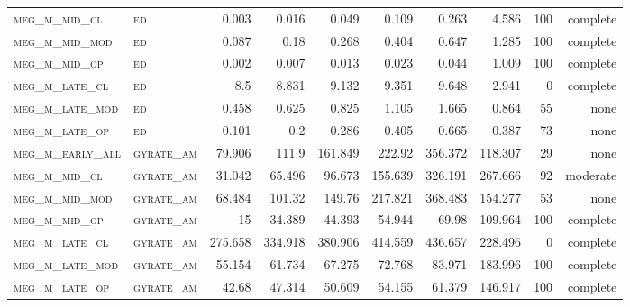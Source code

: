 \begin{landscape}
\begin{center}
\begin{footnotesize}
\begin{longtable}{llrrrrr|rrr}
\textsc{meg\_m\_mid\_cl   } & \textsc{ed        }    & 0.003    & 0.016    & 0.049    & 0.109    & 0.263      & 4.586         & 100           & complete             \\
\textsc{meg\_m\_mid\_mod  } & \textsc{ed        }    & 0.087    & 0.18     & 0.268    & 0.404    & 0.647      & 1.285         & 100           & complete             \\
\textsc{meg\_m\_mid\_op   } & \textsc{ed        }    & 0.002    & 0.007    & 0.013    & 0.023    & 0.044      & 1.009         & 100           & complete             \\
\textsc{meg\_m\_late\_cl  } & \textsc{ed        }    & 8.5      & 8.831    & 9.132    & 9.351    & 9.648      & 2.941         & 0             & complete            \\
\textsc{meg\_m\_late\_mod } & \textsc{ed        }    & 0.458    & 0.625    & 0.825    & 1.105    & 1.665      & 0.864         & 55            & none              \\
\textsc{meg\_m\_late\_op  } & \textsc{ed        }    & 0.101    & 0.2      & 0.286    & 0.405    & 0.665      & 0.387         & 73            & none              \\
\textsc{meg\_m\_early\_all} & \textsc{gyrate\_am}    & 79.906   & 111.9    & 161.849  & 222.92   & 356.372    & 118.307       & 29            & none             \\
\textsc{meg\_m\_mid\_cl   } & \textsc{gyrate\_am}    & 31.042   & 65.496   & 96.673   & 155.639  & 326.191    & 267.666       & 92            & moderate              \\
\textsc{meg\_m\_mid\_mod  } & \textsc{gyrate\_am}    & 68.484   & 101.32   & 149.76   & 217.821  & 368.483    & 154.277       & 53            & none               \\
\textsc{meg\_m\_mid\_op   } & \textsc{gyrate\_am}    & 15       & 34.389   & 44.393   & 54.944   & 69.98      & 109.964       & 100           & complete             \\
\textsc{meg\_m\_late\_cl  } & \textsc{gyrate\_am}    & 275.658  & 334.918  & 380.906  & 414.559  & 436.657    & 228.496       & 0             & complete            \\
\textsc{meg\_m\_late\_mod } & \textsc{gyrate\_am}    & 55.154   & 61.734   & 67.275   & 72.768   & 83.971     & 183.996       & 100           & complete             \\
\textsc{meg\_m\_late\_op  } & \textsc{gyrate\_am}    & 42.68    & 47.314   & 50.609   & 54.155   & 61.379     & 146.917       & 100           & complete             \\

\end{longtable}
\end{footnotesize}
\end{center}
\end{landscape}
